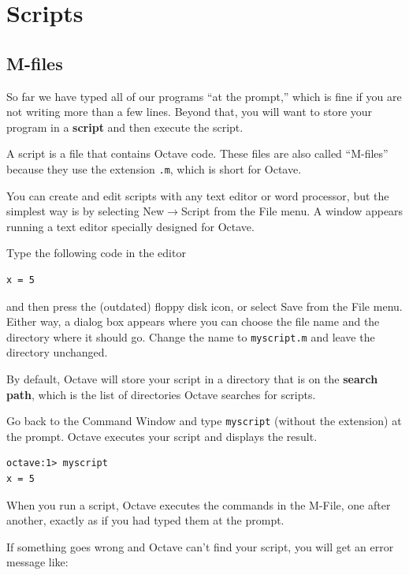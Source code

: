 \documentclass{book}
\begin{document}

\chapter{Scripts}

\section{M-files}

So far we have typed all of our programs ``at the prompt,'' which is
fine if you are not writing more than a few lines. Beyond that,
you will want to store your program in a {\bf script} and then
execute the script.

A script is a file that contains Octave code. These files are
also called ``M-files'' because they use the extension {\tt .m},
which is short for Octave.

You can create and edit
scripts with any text editor or word processor, but the simplest way
is by selecting {\sf New}$\rightarrow${\sf Script} from the {\sf File}
menu. A window appears running a text editor specially designed for
Octave.

Type the following code in the editor

\begin{verbatim}
x = 5
\end{verbatim}

and then press the (outdated) floppy disk icon, or select {\sf Save}
from the {\sf File} menu. Either way, a dialog box appears where you
can choose the file name and the directory where it should go. Change
the name to {\tt myscript.m} and leave the directory unchanged.

By default, Octave will store your script in a directory that is on
the {\bf search path}, which is the list of directories Octave
searches for scripts.

Go back to the Command Window and type {\tt myscript} (without the
extension) at the prompt. Octave executes your script and displays
the result.

\begin{verbatim}
octave:1> myscript
x = 5
\end{verbatim}

When you run a script, Octave executes the commands in the M-File, one
after another, exactly as if you had typed them at the prompt.

If something goes wrong and Octave can't find your script, you will
get an error message like:
\end{document}
